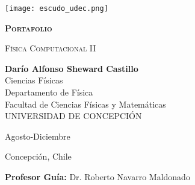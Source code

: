 \documentclass[../portafolio.tex]{subfiles}
\begin{document}


\begin{titlepage}
  
  
  \thispagestyle{frontpage}
  
  \begin{center}
    
    \texttt{[image: escudo\_udec.png]}
    
    
    \vspace*{3\baselineskip}

      \textsc{\Huge \textbf{Portafolio}}
      \vspace*{1.5\baselineskip}
      
      \textsc{\huge Física Computacional II}\\ %
      
      \vspace*{4\baselineskip}
      
      \large{\textbf{Darío Alfonso Sheward Castillo}}\\ 
      
      \large{Ciencias Físicas \\
        Departamento de Física \\
        Facultad de Ciencias Físicas y Matemáticas\\
        UNIVERSIDAD DE CONCEPCIÓN}
      
    
    \vspace{4\baselineskip}

    Agosto-Diciembre \the\year

    \vspace{0.1\baselineskip}

    Concepción, Chile 

    \vspace{1.5\baselineskip}
    
    \large{\textbf{Profesor Guía:} Dr. Roberto Navarro Maldonado}\\
    
  \end{center}
  
  \vspace*{4\baselineskip}
  
  
\end{titlepage}
\end{document}

